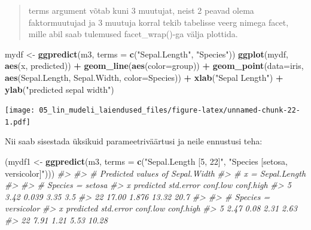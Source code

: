 \documentclass[]{book}
\newenvironment{Shaded}{\begin{snugshade}}{\end{snugshade}}
\newcommand{\CommentTok}[1]{\textcolor[rgb]{0.56,0.35,0.01}{\textit{#1}}}
\newcommand{\DataTypeTok}[1]{\textcolor[rgb]{0.13,0.29,0.53}{#1}}
\newcommand{\KeywordTok}[1]{\textcolor[rgb]{0.13,0.29,0.53}{\textbf{#1}}}
\newcommand{\NormalTok}[1]{#1}
\newcommand{\OperatorTok}[1]{\textcolor[rgb]{0.81,0.36,0.00}{\textbf{#1}}}
\newcommand{\StringTok}[1]{\textcolor[rgb]{0.31,0.60,0.02}{#1}}
\begin{document}
\begin{quote}
terms argument võtab kuni 3 muutujat, neist 2 peavad olema faktormuutujad ja 3 muutuja korral tekib tabelisse veerg nimega facet, mille abil saab tulemused facet\_wrap()-ga välja plottida.
\end{quote}

\begin{Shaded}
\begin{Highlighting}[]
\NormalTok{mydf <-}\StringTok{ }\KeywordTok{ggpredict}\NormalTok{(m3, }\DataTypeTok{terms =} \KeywordTok{c}\NormalTok{(}\StringTok{"Sepal.Length"}\NormalTok{, }\StringTok{"Species"}\NormalTok{))}
\KeywordTok{ggplot}\NormalTok{(mydf, }\KeywordTok{aes}\NormalTok{(x, predicted)) }\OperatorTok{+}\StringTok{ }
\StringTok{  }\KeywordTok{geom_line}\NormalTok{(}\KeywordTok{aes}\NormalTok{(}\DataTypeTok{color=}\NormalTok{group)) }\OperatorTok{+}\StringTok{ }
\StringTok{  }\KeywordTok{geom_point}\NormalTok{(}\DataTypeTok{data=}\NormalTok{iris, }\KeywordTok{aes}\NormalTok{(Sepal.Length, Sepal.Width, }\DataTypeTok{color=}\NormalTok{Species)) }\OperatorTok{+}\StringTok{ }
\StringTok{  }\KeywordTok{xlab}\NormalTok{(}\StringTok{"Sepal Length"}\NormalTok{) }\OperatorTok{+}
\StringTok{  }\KeywordTok{ylab}\NormalTok{(}\StringTok{"predicted sepal width"}\NormalTok{)}
\end{Highlighting}
\end{Shaded}

\texttt{[image: 05\_lin\_mudeli\_laiendused\_files/figure-latex/unnamed-chunk-22-1.pdf]}

Nii saab sisestada üksikuid parameetriväärtusi ja neile ennustusi teha:

\begin{Shaded}
\begin{Highlighting}[]
\NormalTok{(mydf1 <-}\StringTok{ }\KeywordTok{ggpredict}\NormalTok{(m3, }\DataTypeTok{terms =} \KeywordTok{c}\NormalTok{(}\StringTok{"Sepal.Length [5, 22]"}\NormalTok{, }\StringTok{"Species [setosa, versicolor]"}\NormalTok{)))}
\CommentTok{#> }
\CommentTok{#> # Predicted values of Sepal.Width}
\CommentTok{#> # x = Sepal.Length}
\CommentTok{#> }
\CommentTok{#> # Species = setosa}
\CommentTok{#>   x predicted std.error conf.low conf.high}
\CommentTok{#>   5      3.42     0.039     3.35       3.5}
\CommentTok{#>  22     17.00     1.876    13.32      20.7}
\CommentTok{#> }
\CommentTok{#> # Species = versicolor}
\CommentTok{#>   x predicted std.error conf.low conf.high}
\CommentTok{#>   5      2.47      0.08     2.31      2.63}
\CommentTok{#>  22      7.91      1.21     5.53     10.28}
\end{Highlighting}
\end{Shaded}
\end{document}
